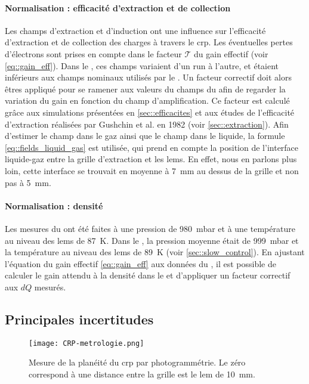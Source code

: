         \paragraph{Normalisation : efficacité d'extraction et de collection} Les champs d'extraction et d'induction ont une influence sur l'efficacité d'extraction et de collection des charges à travers le \gls{crp}. Les éventuelles pertes d'électrons sont prises en compte dans le facteur $\mathcal{T}$ du gain effectif (voir \autoref{eq::gain_eff}). Dans le \TOO{}, ces champs variaient d'un run à l'autre, et étaient inférieurs aux champs nominaux utilisés par le \threeL{}. Un facteur correctif doit alors êtres appliqué pour se ramener aux valeurs du champs du \threeL{} afin de regarder la variation du gain en fonction du champ d'amplification. Ce facteur est calculé grâce aux simulations présentées en \autoref{sec::efficacites} et aux études de l'efficacité d'extraction réalisées par Gushchin et al. en 1982\cite{guschin} (voir \autoref{sec::extraction}). Afin d'estimer le champ dans le gaz ainsi que le champ dans le liquide, la formule \eqref{eq::fields_liquid_gas} est utilisée, qui prend en compte la position de l'interface liquide-gaz entre la grille d'extraction et les \glspl{lem}. En effet, nous en parlons plus loin, cette interface se trouvait en moyenne à \SI{7}{\milli\meter} au dessus de la grille et non pas à \SI{5}{\milli\meter}.

        \paragraph{Normalisation : densité} Les mesures du \threeL{} ont été faites à une pression de \SI{980}{\milli\bar} et à une température au niveau des \glspl{lem} de \SI{87}{\kelvin}. Dans le \TOO{}, la pression moyenne était de \SI{999}{\milli\bar} et la température au niveau des \glspl{lem} de \SI{89}{\kelvin} (voir \autoref{sec::slow_control}). En ajustant l'équation du gain effectif \eqref{eq::gain_eff} aux données du \threeL{}, il est possible de calculer le gain attendu à la densité dans le \TOO{} et d'appliquer un facteur correctif aux $dQ$ mesurés.

    \subsection{Principales incertitudes}\label{sec::uncertainties}
        
      \begin{figure}[htbp]
        \centering
        \texttt{[image: CRP-metrologie.png]}
        \caption[Mesure de la planéité du CRP]{\label{fig::crp_var}Mesure de la planéité du \gls{crp} par photogrammétrie. Le zéro correspond à une distance entre la grille est le \gls{lem} de \SI{10}{\milli\meter}.}
      \end{figure}

